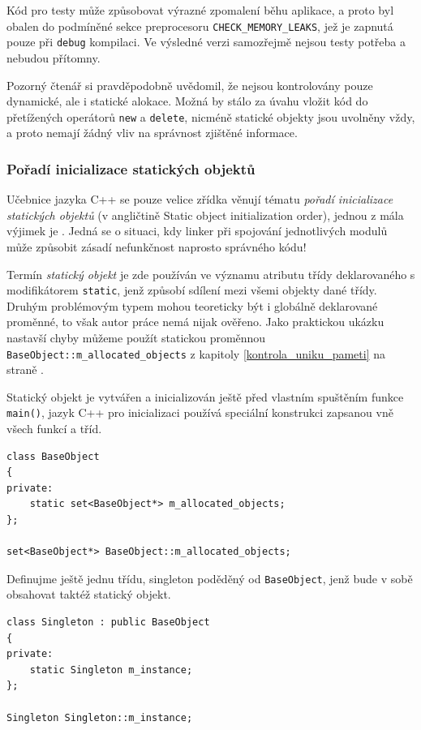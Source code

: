 \documentclass[11pt,twoside,a4paper]{book}
\begin{document}
Kód pro testy může způsobovat výrazné zpomalení běhu aplikace, a proto byl obalen do podmíněné sekce preprocesoru \texttt{CHECK\_MEMORY\_LEAKS}, jež je zapnutá pouze při \texttt{debug} kompilaci. Ve výsledné verzi samozřejmě nejsou testy potřeba a nebudou přítomny.

Pozorný čtenář si pravděpodobně uvědomil, že nejsou kontrolovány pouze dynamické, ale i statické alokace. Možná by stálo za úvahu vložit kód do přetížených operátorů \texttt{new} a \texttt{delete}, nicméně statické objekty jsou uvolněny vždy, a proto nemají žádný vliv na správnost zjištěné informace.


\subsubsection{Pořadí inicializace statických objektů}

Učebnice jazyka C++ se pouze velice zřídka věnují tématu \textit{pořadí inicializace statických objektů} (v angličtině Static object initialization order), jednou z mála výjimek je \cite{industrial_strength_cpp}. Jedná se o situaci, kdy linker při spojování jednotlivých modulů může způsobit zásadí nefunkčnost naprosto správného kódu!

Termín \textit{statický objekt} je zde používán ve významu atributu třídy deklarovaného s modifikátorem \texttt{static}, jenž způsobí sdílení mezi všemi objekty dané třídy. Druhým problémovým typem mohou teoreticky být i globálně deklarované proměnné, to však autor práce nemá nijak ověřeno. Jako praktickou ukázku nastavší chyby můžeme použít statickou proměnnou \texttt{BaseObject::m\_allocated\_objects} z kapitoly \ref{kontrola_uniku_pameti} na straně \pageref{kontrola_uniku_pameti}.

Statický objekt je vytvářen a inicializován ještě před vlastním spuštěním funkce \texttt{main()}, jazyk C++ pro inicializaci používá speciální konstrukci zapsanou vně všech funkcí a tříd.

\begin{verbatim}
class BaseObject
{
private:
    static set<BaseObject*> m_allocated_objects;
};

set<BaseObject*> BaseObject::m_allocated_objects;
\end{verbatim}

Definujme ještě jednu třídu, singleton poděděný od \texttt{BaseObject}, jenž bude v sobě obsahovat taktéž statický objekt.

\begin{verbatim}
class Singleton : public BaseObject
{
private:
    static Singleton m_instance;
};

Singleton Singleton::m_instance;
\end{verbatim}
\end{document}
